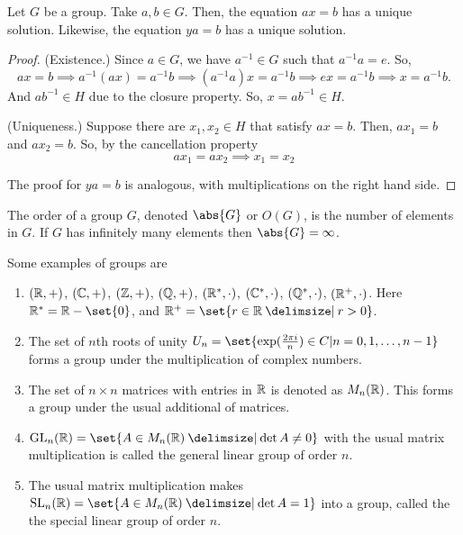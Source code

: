 \documentclass[11pt]{penrose}
\begin{document}
\begin{nthm}
    Let $G$ be a group. Take $a, b \in G$. Then, the equation $a x = b$ has a unique solution. Likewise, the equation $y a = b$ has a unique solution.
\end{nthm}
\begin{proof}
    (Existence.) Since $a \in G$, we have $a^{-1} \in G$ such that $a^{-1} a = e$. So,
    \begin{equation*}
        ax = b
        \implies a^{-1} (a x) = a^{-1} b
        \implies (a^{-1} a) x = a^{-1} b
        \implies e x = a^{-1} b
        \implies x = a^{-1} b.
    \end{equation*}
    And $a b^{-1} \in H$ due to the closure property. So, $x = ab^{-1} \in H$.

    (Uniqueness.) Suppose there are $x_1, x_2 \in H$ that satisfy $a x = b$. Then, $a x_1 = b$ and $a x_2 = b$. So, by the cancellation property
    \begin{equation*}
        a x_1 = a x_2
        \implies x_1 = x_2
    \end{equation*}
    
    The proof for $y a = b$ is analogous, with multiplications on the right hand side.
\end{proof}

\begin{ndfn}
    The order of a group $G$, denoted $\abs{G}$ or $O(G)$, is the number of elements in $G$. If $G$ has infinitely many elements then $\abs{G} = \infty$.
\end{ndfn}

\begin{egg}
    Some examples of groups are
    \begin{enumerate}
        \item $(\mathbb{R},+)$, $(\mathbb{C},+)$, $(\mathbb{Z},+)$, $(\mathbb{Q},+)$, $(\mathbb{R}^{*},\cdot)$, $(\mathbb{C}^{*},\cdot)$, $(\mathbb{Q}^{*},\cdot)$, $(\mathbb{R}^{+},\cdot)$. Here $\R^{*} = \R - \set{0}$, and $\R^{+} = \set{r \in \R \st r > 0}$.
        \item The set of $n$th roots of unity $U_n = \set{\exp(\frac{2\pi i}{n}) \in C | n = 0, 1, \dots, n-1}$ forms a group under the multiplication of complex numbers.
        \item The set of $n \times n$ matrices with entries in $\mathbb{R}$ is denoted as $M_{n}(\mathbb{R})$. This forms a group under the usual additional of matrices.
        \item $\GL_{n}(\R) = \set{A \in M_{n}(\R) \st \det A \neq 0}$ with the usual matrix multiplication is called the general linear group of order $n$.
        \item The usual matrix multiplication makes $\SL_{n}(\R) = \set{A \in M_{n}(\R) \st \det A = 1}$ into a group, called the the special linear group of order $n$.
    \end{enumerate}
\end{egg}
\end{document}
